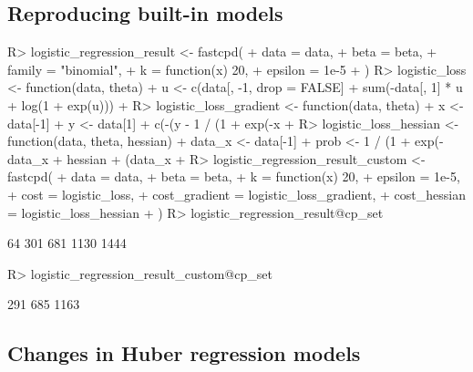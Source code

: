 \documentclass[article]{jss}
\begin{document}
\subsection{Reproducing built-in models} \label{sec:reproduce}


\begin{Schunk}
\begin{Sinput}
R> logistic_regression_result <- fastcpd(
+    data = data,
+    beta = beta,
+    family = "binomial",
+    k = function(x) 20,
+    epsilon = 1e-5
+  )
R> logistic_loss <- function(data, theta) {
+    u <- c(data[, -1, drop = FALSE] %*% theta)
+    sum(-data[, 1] * u + log(1 + exp(u)))
+  }
R> logistic_loss_gradient <- function(data, theta) {
+    x <- data[-1]
+    y <- data[1]
+    c(-(y - 1 / (1 + exp(-x %*% theta)))) * x
+  }
R> logistic_loss_hessian <- function(data, theta, hessian) {
+    data_x <- data[-1]
+    prob <- 1 / (1 + exp(-data_x %*% theta))
+    hessian + (data_x %o% data_x) * c((1 - prob) * prob)
+  }
R> logistic_regression_result_custom <- fastcpd(
+    data = data,
+    beta = beta,
+    k = function(x) 20,
+    epsilon = 1e-5,
+    cost = logistic_loss,
+    cost_gradient = logistic_loss_gradient,
+    cost_hessian = logistic_loss_hessian
+  )
R> logistic_regression_result@cp_set
\end{Sinput}
\begin{Soutput}
[1]   64  301  681 1130 1444
\end{Soutput}
\begin{Sinput}
R> logistic_regression_result_custom@cp_set
\end{Sinput}
\begin{Soutput}
[1]  291  685 1163
\end{Soutput}
\end{Schunk}

\subsection{Changes in Huber regression models} \label{sec:huber}
\end{document}
